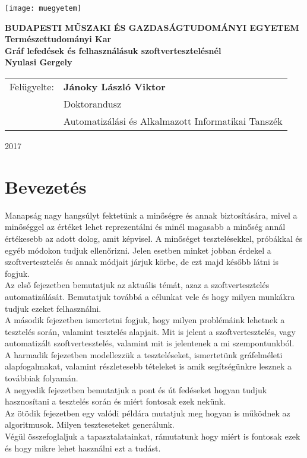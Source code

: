 \documentclass[12pt]{article}
\begin{document}
\begin{titlepage}
\centering
\texttt{[image: muegyetem]}

\bfseries\small{
BUDAPESTI MŰSZAKI ÉS GAZDASÁGTUDOMÁNYI EGYETEM
}\\
Természettudományi Kar\\
\vfill
\Large{Gráf lefedések és felhasználásuk szoftvertesztelésnél}\\
Nyulasi Gergely\\

\vfill
\vspace{4mm}
\begin{center}
\begin{tabular}{ll}
\normalsize Felügyelte: & \normalsize \textbf{Jánoky László Viktor}\\
& \normalsize Doktorandusz\\
& \normalsize Automatizálási és Alkalmazott Informatikai Tanszék
\end{tabular} 
\end{center}
\vfill
2017
\end{titlepage}

\pagebreak

\tableofcontents

\pagebreak

\section{Bevezetés}

Manapság nagy hangsúlyt fektetünk a minőségre és annak biztosítására, mivel a minőséggel az értéket lehet reprezentálni és minél magasabb a minőség annál értékesebb az adott dolog, amit képvisel. A minőséget tesztelésekkel, próbákkal és egyéb módokon tudjuk ellenőrizni.
Jelen esetben minket jobban érdekel a szoftvertesztelés és annak módjait járjuk körbe, de ezt majd később látni is fogjuk.\\

Az első fejezetben bemutatjuk az aktuális témát, azaz a szoftvertesztelés automatizálását. Bemutatjuk továbbá a célunkat vele és hogy milyen munkákra tudjuk ezeket felhasználni.\\
A második fejezetben ismertetni fogjuk, hogy milyen problémáink lehetnek a tesztelés során, valamint tesztelés alapjait.
 Mit is jelent a szoftvertesztelés, vagy automatizált szoftvertesztelés, valamint mit is jelentenek a mi szempontunkból.\\
A harmadik fejezetben modellezzük a teszteléseket, ismertetünk gráfelméleti alapfogalmakat, valamint részletesebb tételeket is amik segítségünkre lesznek a továbbiak folyamán.\\
A negyedik fejezetben bemutatjuk a pont és út fedéseket hogyan tudjuk hasznosítani a tesztelés során és miért fontosak ezek nekünk.\\
Az ötödik fejezetben egy valódi példára mutatjuk meg hogyan is működnek az algoritmusok. Milyen teszteseteket generálunk.\\
Végül összefoglaljuk a tapasztalatainkat, rámutatunk hogy miért is fontosak ezek és hogy mikre lehet használni ezt a tudást.\\
\end{document}
